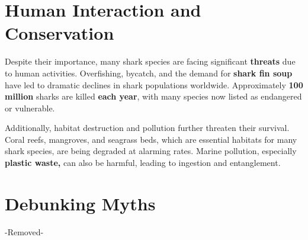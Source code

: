 \section{Human Interaction and Conservation}
Despite their importance, many shark species are facing significant \textbf{threats} due to human activities. Overfishing, bycatch, and the demand for\textbf{ shark fin soup} have led to dramatic declines in shark populations worldwide. Approximately \textbf{100 million} sharks are killed \textbf{each year}, with many species now listed as endangered or vulnerable.

Additionally, habitat destruction and pollution further threaten their survival. Coral reefs, mangroves, and seagrass beds, which are essential habitats for many shark species, are being degraded at alarming rates. Marine pollution, especially\textbf{ plastic waste,} can also be harmful, leading to ingestion and entanglement.



\section{Debunking Myths} -Removed-



